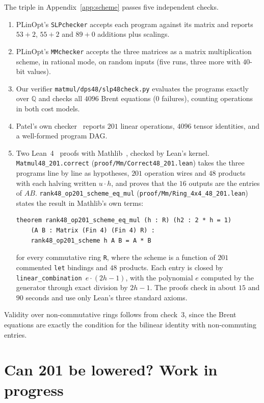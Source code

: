 \documentclass[11pt]{article}
\theoremstyle{remark}
\newcommand{\Q}{\mathbb{Q}}
\begin{document}
The triple in Appendix~\ref{app:scheme} passes five independent checks.
\begin{enumerate}
\item PLinOpt's \texttt{SLPchecker} accepts each program against its
  matrix and reports $53+2$, $55+2$ and $89+0$ additions plus scalings.
\item PLinOpt's \texttt{MMchecker} accepts the three matrices as a
  matrix multiplication scheme, in rational mode, on random inputs
  (five runs, three more with $40$-bit values).
\item Our verifier \texttt{matmul/dps48/slp48check.py} evaluates the
  programs exactly over $\Q$ and checks all $4096$ Brent equations
  ($0$ failures), counting operations in both cost models.
\item Patel's own checker~\cite{Patel26} reports $201$ linear
  operations, $4096$ tensor identities, and a well-formed program DAG.
\item Two Lean~4~\cite{Lean4} proofs with Mathlib~\cite{Mathlib}, checked
  by Lean's kernel.  \texttt{Matmul48\_201.correct}
  (\texttt{proof/Mm/Correct48\_201.lean}) takes the three programs line
  by line as hypotheses, $201$ operation wires and $48$ products with
  each halving written $u\cdot h$, and proves that the $16$ outputs are
  the entries of $AB$.  \texttt{rank48\_op201\_scheme\_eq\_mul}
  (\texttt{proof/Mm/Ring\_4x4\_48\_201.lean}) states the result in
  Mathlib's own terms:
\begin{verbatim}
theorem rank48_op201_scheme_eq_mul (h : R) (h2 : 2 * h = 1)
    (A B : Matrix (Fin 4) (Fin 4) R) :
    rank48_op201_scheme h A B = A * B
\end{verbatim}
  for every commutative ring \texttt{R}, where the scheme is a function
  of $201$ commented \texttt{let} bindings and $48$ products.  Each
  entry is closed by \texttt{linear\_combination}~$e\cdot(2h-1)$, with
  the polynomial $e$ computed by the generator through exact division by
  $2h-1$.  The proofs check in about $15$ and $90$ seconds and use only
  Lean's three standard axioms.
\end{enumerate}
Validity over non-commutative rings follows from check~3, since the
Brent equations are exactly the condition for the bilinear identity with
non-commuting entries.

\section{Can 201 be lowered? Work in progress}\label{sec:lower}
\end{document}
